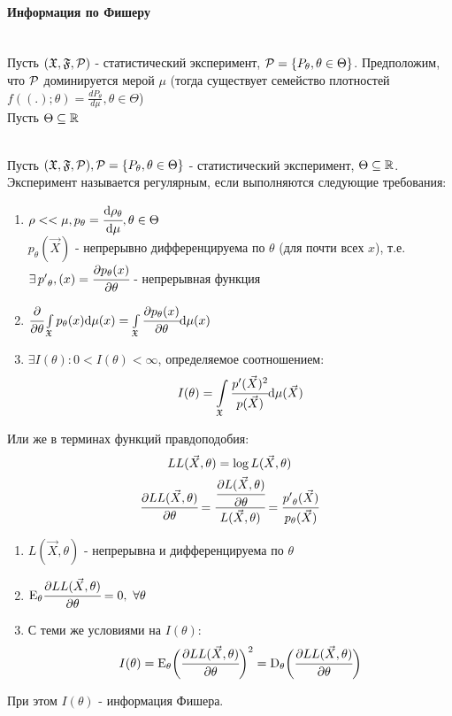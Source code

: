 \documentclass[main.tex]{subfiles}
\begin{document}
\paragraph{Информация по Фишеру}~\\

Пусть $(\mathfrak{X},\mathfrak{F},\mathcal{P})$ - статистический эксперимент, $\mathcal{P}=\{P_\theta, \theta\in\Theta\}$. Предположим, что $\mathcal{P}$ доминируется мерой $\mu$ (тогда существует семейство плотностей $f((.);\theta)=\frac{dP_\theta}{d\mu}, \theta\in\Theta$)\\
Пусть $\Theta\subseteq\mathbb{R}$

\begin{definition} ~\\
	Пусть $(\mathfrak{X},\mathfrak{F},\mathcal{P}), \mathcal{P} = \{P_\theta, \theta \in \Theta\}$ - статистический эксперимент, $\Theta \subseteq \mathbb{R}$.\\
	Эксперимент называется регулярным, если выполняются следующие требования:
	\begin{enumerate}
		\item $\rho << \mu, p_\theta = \cfrac{\mathrm{d}\rho_\theta}{\mathrm{d}\mu}, \theta \in \Theta$\\
			  $p_\theta(\vec X)$ - непрерывно дифференцируема по $\theta$ (для почти всех $x$), т.е.
			  $\exists\, {p'}_\theta, (x) = \cfrac{\partial p_\theta(x)}{\partial\theta}$ - непрерывная функция
		\item $\cfrac{\partial}{\partial\theta}\int\limits_{\mathfrak{X}} p_\theta(x)\mathrm{d}\mu(x) = \int\limits_{\mathfrak{X}} \cfrac{\partial p_\theta(x)}{\partial\theta}\mathrm{d}\mu(x)$
		\item $\exists I(\theta): 0 < I(\theta) < \infty$, определяемое соотношением:
		\[I(\theta) = \int\limits_{\mathfrak{X}} \cfrac{p'(\vec X)^2}{p(\vec X)}\mathrm{d}\mu(\vec X)\]
	\end{enumerate}
	Или же в терминах функций правдоподобия:
	\begin{gather*}
		LL(\vec X, \theta) = \log L(\vec X, \theta)\\
		\cfrac{\partial LL(\vec X, \theta)}{\partial\theta} = \cfrac{\cfrac{\partial L(\vec X, \theta)}{\partial \theta}}{L(\vec X, \theta)} = \cfrac{{p'}_\theta(\vec X)}{p_\theta(\vec X)}
	\end{gather*}
	\begin{enumerate}
		\item $L(\vec X, \theta)$ - непрерывна и дифференцируема по $\theta$
		\item $\mathrm{E}_\theta\cfrac{\partial LL(\vec X, \theta)}{\partial\theta} = 0,\ \forall \theta$
		\item С теми же условиями на $I(\theta)$:
		\[I(\theta) = \mathrm{E}_\theta\bigg(\cfrac{\partial LL(\vec X, \theta)}{\partial \theta}\bigg)^2 = \mathrm{D}_\theta\bigg(\cfrac{\partial LL(\vec X, \theta)}{\partial \theta}\bigg)\]
	\end{enumerate}
	При этом $I(\theta)$ - информация Фишера.
\end{definition}
\end{document}
